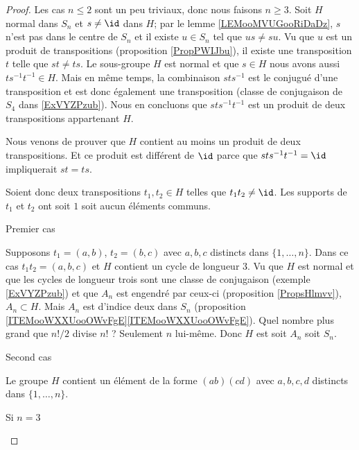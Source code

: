 \begin{proof}
    Les cas \( n\leq 2\) sont un peu triviaux, donc nous faisons \( n\geq 3\). Soit \( H\) normal dans \( S_n\) et \( s\neq \id\) dans \( H\); par le lemme \ref{LEMooMVUGooRiDaDz}, \( s\) n'est pas dans le centre de \( S_n\) et il existe \( u\in S_n\) tel que \( us\neq su\). Vu que \( u\) est un produit de transpositions (proposition \ref{PropPWIJbu}), il existe une transposition \( t\) telle que \( st\neq ts\). Le sous-groupe \( H\) est normal et que \( s\in H\) nous avons aussi \( ts^{-1}t^{-1}\in H\). Mais en même temps, la combinaison \( sts^{-1}\) est le conjugué d'une transposition et est donc également une transposition (classe de conjugaison de \( S_4\) dans \ref{ExVYZPzub}). Nous en concluons que \( sts^{-1}t^{-1}\) est un produit de deux transpositions appartenant \( H\).

    Nous venons de prouver que \( H\) contient au moins un produit de deux transpositions. Et ce produit est différent de \( \id\) parce que \( sts^{-1}t^{-1}=\id\) impliquerait \( st=ts\).

    Soient donc deux transpositions \( t_1,t_2\in H\) telles que \( t_1t_2\neq \id\). Les supports de \( t_1\) et \( t_2\) ont soit \( 1\) soit aucun éléments communs.

    \begin{subproof}
        \item[Premier cas]

            Supposons \( t_1=(a,b)\), \( t_2=(b,c)\) avec \( a,b,c\) distincts dans \( \{ 1,\ldots, n \}\). Dans ce cas \( t_1t_2=(a,b,c)\) et \( H\) contient un cycle de longueur \( 3\). Vu que \( H\) est normal et que les cycles de longueur trois sont une classe de conjugaison (exemple \ref{ExVYZPzub}) et que \( A_n\) est engendré par ceux-ci (proposition \ref{PropsHlmvv}), \( A_n\subset H\). Mais \( A_n\) est d'indice deux dans \( S_n\) (proposition \ref{ITEMooWXXUooOWvFgE}\ref{ITEMooWXXUooOWvFgE}). Quel nombre plus grand que \( n!/2\) divise \( n!\) ? Seulement \( n\) lui-même. Donc \( H\) est soit \( A_n\) soit \( S_n\).

        \item[Second cas]

            Le groupe \( H\) contient un élément de la forme \( (ab)(cd)\) avec \( a,b,c,d\) distincts dans \( \{ 1,\ldots, n \}\).

            \begin{subproof}

                \item[Si \( n=3\)]


\end{subproof}
\end{subproof}
\end{proof}
